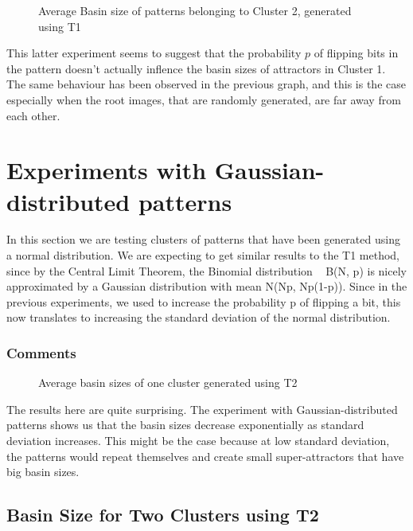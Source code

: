 \begin{figure}[h]
  \centering
  
\caption{Average Basin size of patterns belonging to Cluster 2, generated using T1}
\label{fig:plot-T1-twocluster}
\end{figure}

This latter experiment seems to suggest that the probability $p$ of flipping bits in the pattern doesn't actually inflence the basin sizes of attractors in Cluster 1. The same behaviour has been observed in the previous graph, and this is the case especially when the root images, that are randomly generated, are far away from each other.

\section{Experiments with Gaussian-distributed patterns}

In this section we are testing clusters of patterns that have been generated using a normal distribution. We are expecting to get similar results to the T1 method, since by the Central Limit Theorem, the Binomial distribution ~ B(N, p) is nicely approximated by a Gaussian distribution with mean N(Np, Np(1-p)). Since in the previous experiments, we used to increase the probability p of flipping a bit, this now translates to increasing the standard deviation of the normal distribution.


\subsubsection{Comments}

\begin{figure}[h]
  \centering
  
\caption{Average basin sizes of one cluster generated using T2}
\label{fig:plot-T2-onecluster}
\end{figure}

The results here are quite surprising. The experiment with Gaussian-distributed patterns shows us that the basin sizes decrease exponentially as standard deviation increases. This might be the case because at low standard deviation, the patterns would repeat themselves and create small super-attractors that have big basin sizes.

\subsection{Basin Size for Two Clusters using T2}

